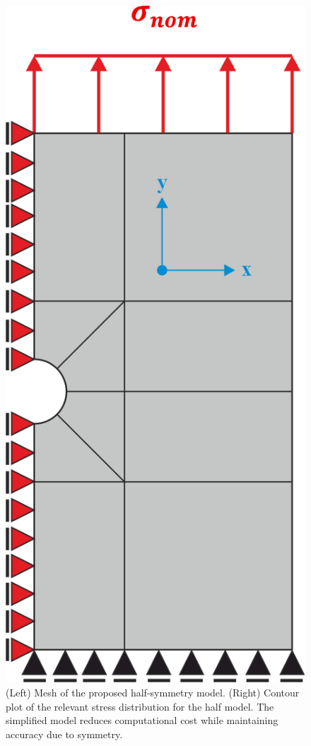\documentclass[12pt]{article}
\begin{document}
\begin{figure}[H]
\begin{minipage}{0.48\textwidth}
        \vspace{-2.6em} %
    \end{minipage}
    \hfill
    \begin{minipage}{0.4\textwidth}
        \centering
        \includegraphics[width=\textwidth]{images/half.png}
    \end{minipage}
    \caption{(Left) Mesh of the proposed half-symmetry model. (Right) Contour plot of the relevant stress distribution for the half model. The simplified model reduces computational cost while maintaining accuracy due to symmetry.}
\end{figure}
\end{document}
